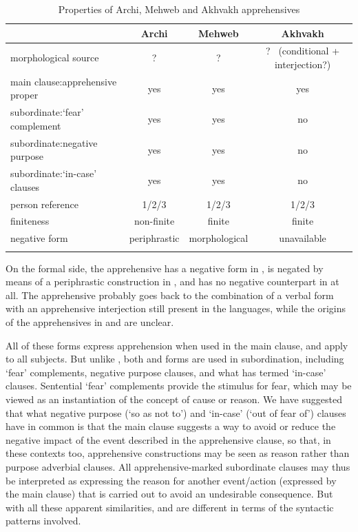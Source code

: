 \documentclass[output=paper,colorlinks,citecolor=brown]{langscibook}
\begin{document}
\begin{table}

\caption{Properties of Archi, Mehweb and Akhvakh apprehensives}
\label{tab:summary}
\begin{tabularx}{\textwidth}{QccC}
\lsptoprule
\textbf{} & \textbf{Archi} & \textbf{Mehweb} & \textbf{Akhvakh} \\
\midrule
morphological source & ? & ? & \hfill ?\hfill~ \newline (conditional + interjection?) \\
\tablevspace
main clause:\newline apprehensive proper & yes & yes & yes \\
\tablevspace
subordinate:\newline `fear' complement & yes & yes & no \\
\tablevspace
subordinate:\newline negative purpose & yes & yes & no \\
\tablevspace
subordinate:\newline `in-case' clauses & yes & yes & no \\
\tablevspace
person reference & 1/2/3 & 1/2/3 & 1/2/3 \\
\tablevspace
finiteness & non-finite & finite & finite \\
\tablevspace
negative form & periphrastic & morphological & unavailable \\
\lspbottomrule
\end{tabularx}
\end{table}

 
\noindent On the formal side, the apprehensive has a negative form in , is negated by means of a periphrastic construction in , and has no negative counterpart in  at all. The  apprehensive probably goes back to the combination of a verbal form with an apprehensive interjection still present in the languages, while the origins of the apprehensives in  and  are unclear. 

All of these forms express apprehension when used in the main clause, and apply to all subjects. But unlike , both  and  forms are used in subordination, including `fear' complements, negative purpose clauses, and what \citet{lichtenberk1995} has termed `in-case' clauses. Sentential `fear' complements provide the stimulus for fear, which may be viewed as an instantiation of the concept of cause or reason. We have suggested that what negative purpose (`so as not to') and `in-case' (`out of fear of') clauses have in common is that the main clause suggests a way to avoid or reduce the negative impact of the event described in the apprehensive clause, so that, in these contexts too, apprehensive constructions may be seen as reason rather than purpose adverbial clauses. All apprehensive-marked subordinate clauses may thus be interpreted as expressing the reason for another event/action (expressed by the main clause) that is carried out to avoid an undesirable consequence. But with all these apparent similarities,  and  are different in terms of the syntactic patterns involved. 
\end{document}
